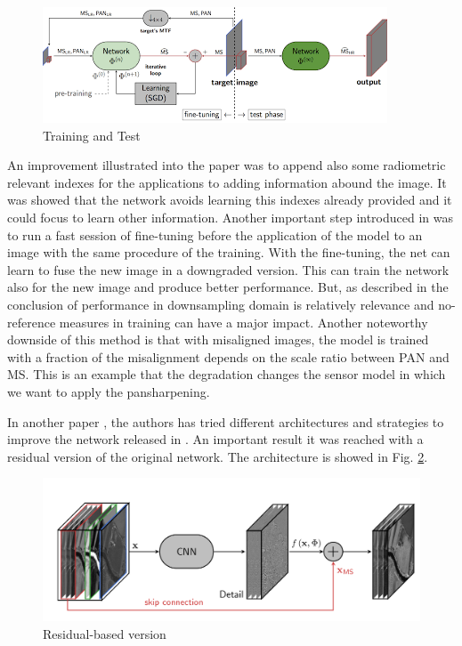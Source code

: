 \documentclass[12pt]{report}
\begin{document}
\begin{figure}[t]
    \centering
    \includegraphics[scale=.9]{pnn-training.png}
    \caption{Training and Test\cite{pnn2}}
    \label{fig:pnn-training}
\end{figure}

An improvement illustrated into the paper was to append also some radiometric relevant indexes  for the applications
to adding information abound the image. It was showed that the network avoids learning this indexes already
provided and it could focus to learn other information.
Another important step introduced in \cite{pnn2} was to run a fast session of fine-tuning before the 
application of the model to an image with the same procedure of the training.
With the fine-tuning, the net can learn to fuse the new image in a downgraded version.
This can train the network also for the new image and produce better performance.
But, as described in the conclusion of \cite{pnn2} performance in downsampling domain is
relatively relevance and no-reference measures in training can have a major impact.
Another noteworthy downside of this method is that with misaligned images, the model is trained
with a fraction of the misalignment depends on the scale ratio between PAN and MS. 
This is an example that the degradation changes the sensor model in which we want to apply the pansharpening.

In another paper \cite{residualpnn}, the authors has tried different architectures and strategies to improve the network released in \cite{pnn}.
An important result it was reached with a residual version of the original network.
The architecture is showed in Fig. \ref{fig:residual-architecture}.

\begin{figure}[t]
    \centering
    \includegraphics[scale=.35]{residualpnn-architecture.png}
    \caption{Residual-based version \cite{residualpnn}}
    \label{fig:residual-architecture}
\end{figure}
\end{document}
